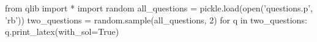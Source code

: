 \documentclass[a4paper]{article}
\begin{document}
\begin{pycode}
from qlib import *
import random
all_questions = pickle.load(open('questions.p', 'rb'))
two_questions = random.sample(all_questions, 2)
for q in two_questions:
	q.print_latex(with_sol=True)
\end{pycode}
\end{document}
